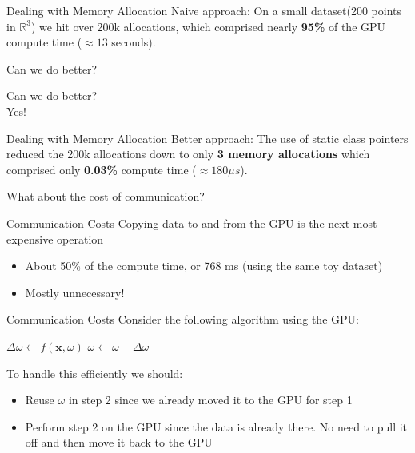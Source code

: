 \documentclass{beamer}
\begin{document}
\begin{frame}{Dealing with Memory Allocation}
  Naive approach:
  On a small dataset(200 points in $\mathbb{R}^3$) we hit over 200k allocations,
  which comprised nearly \textbf{95\%} of the GPU compute time ($\approx 13$
    seconds).
\end{frame}

\begin{frame}[standout]
  Can we do better?
\end{frame}

\begin{frame}[standout]
  Can we do better?\\
  Yes!
\end{frame}

\begin{frame}{Dealing with Memory Allocation}
  Better approach:
  The use of static class pointers reduced the 200k allocations down to only
  \textbf{3 memory allocations} which comprised only \textbf{0.03\%} compute
    time ($\approx 180 \mu s$).
\end{frame}

\begin{frame}[standout]
  What about the cost of communication?
\end{frame}

\begin{frame}{Communication Costs}
  Copying data to and from the GPU is the next most expensive operation
  \begin{itemize}
    \item About 50\% of the compute time, or 768 ms (using the same toy dataset)
    \item Mostly unnecessary!
  \end{itemize}
\end{frame}

\begin{frame}{Communication Costs}
  Consider the following algorithm using the GPU:
  \begin{algorithmic}[1]
    \State $\Delta \omega \gets f(\mathbf{x}, \omega)$
    \State $\omega \gets \omega + \Delta \omega$
  \end{algorithmic}
  
  To handle this efficiently we should:
  \begin{itemize}
    \item Reuse $\omega$ in step 2 since we already moved it to the GPU for step
      1
    \item Perform step 2 on the GPU since the data is already there. No need to
      pull it off and then move it back to the GPU
  \end{itemize}
\end{frame}
\end{document}
